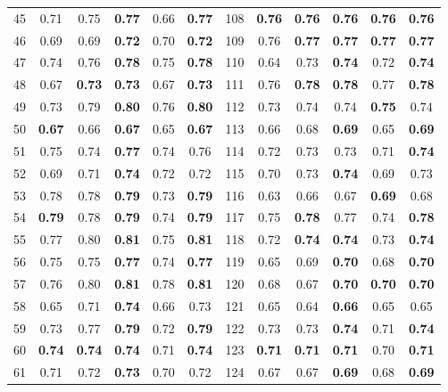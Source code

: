 \documentclass{article}
\begin{document}
{\begin{longtable}{cccccc@{\qquad}cccccc}
45 & 0.71 & 0.75 & \textbf{0.77} & 0.66 & \textbf{0.77} & 108 & \textbf{0.76} & \textbf{0.76} & \textbf{0.76} & \textbf{0.76} & \textbf{0.76} \\
46 & 0.69 & 0.69 & \textbf{0.72} & 0.70 & \textbf{0.72} & 109 & 0.76 & \textbf{0.77} & \textbf{0.77} & \textbf{0.77} & \textbf{0.77} \\
47 & 0.74 & 0.76 & \textbf{0.78} & 0.75 & \textbf{0.78} & 110 & 0.64 & 0.73 & \textbf{0.74} & 0.72 & \textbf{0.74} \\
48 & 0.67 & \textbf{0.73} & \textbf{0.73} & 0.67 & \textbf{0.73} & 111 & 0.76 & \textbf{0.78} & \textbf{0.78} & 0.77 & \textbf{0.78} \\
49 & 0.73 & 0.79 & \textbf{0.80} & 0.76 & \textbf{0.80} & 112 & 0.73 & 0.74 & 0.74 & \textbf{0.75} & 0.74 \\
50 & \textbf{0.67} & 0.66 & \textbf{0.67} & 0.65 & \textbf{0.67} & 113 & 0.66 & 0.68 & \textbf{0.69} & 0.65 & \textbf{0.69} \\
51 & 0.75 & 0.74 & \textbf{0.77} & 0.74 & 0.76 & 114 & 0.72 & 0.73 & 0.73 & 0.71 & \textbf{0.74} \\
52 & 0.69 & 0.71 & \textbf{0.74} & 0.72 & 0.72 & 115 & 0.70 & 0.73 & \textbf{0.74} & 0.69 & 0.73 \\
53 & 0.78 & 0.78 & \textbf{0.79} & 0.73 & \textbf{0.79} & 116 & 0.63 & 0.66 & 0.67 & \textbf{0.69} & 0.68 \\
54 & \textbf{0.79} & 0.78 & \textbf{0.79} & 0.74 & \textbf{0.79} & 117 & 0.75 & \textbf{0.78} & 0.77 & 0.74 & \textbf{0.78} \\
55 & 0.77 & 0.80 & \textbf{0.81} & 0.75 & \textbf{0.81} & 118 & 0.72 & \textbf{0.74} & \textbf{0.74} & 0.73 & \textbf{0.74} \\
56 & 0.75 & 0.75 & \textbf{0.77} & 0.74 & \textbf{0.77} & 119 & 0.65 & 0.69 & \textbf{0.70} & 0.68 & \textbf{0.70} \\
57 & 0.76 & 0.80 & \textbf{0.81} & 0.78 & \textbf{0.81} & 120 & 0.68 & 0.67 & \textbf{0.70} & \textbf{0.70} & \textbf{0.70} \\
58 & 0.65 & 0.71 & \textbf{0.74} & 0.66 & 0.73 & 121 & 0.65 & 0.64 & \textbf{0.66} & 0.65 & 0.65 \\
59 & 0.73 & 0.77 & \textbf{0.79} & 0.72 & \textbf{0.79} & 122 & 0.73 & 0.73 & \textbf{0.74} & 0.71 & \textbf{0.74} \\
60 & \textbf{0.74} & \textbf{0.74} & \textbf{0.74} & 0.71 & \textbf{0.74} & 123 & \textbf{0.71} & \textbf{0.71} & \textbf{0.71} & 0.70 & \textbf{0.71} \\
61 & 0.71 & 0.72 & \textbf{0.73} & 0.70 & 0.72 & 124 & 0.67 & 0.67 & \textbf{0.69} & 0.68 & \textbf{0.69} \\

\end{longtable}}
\end{document}
